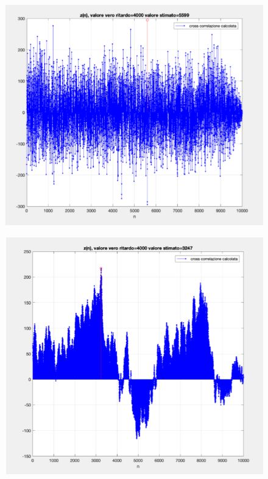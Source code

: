 \begin{minipage}{.45\textwidth}

	\begin{figure}[H]
		\centering
		\includegraphics[width=\textwidth]{./images/cap2/es3_grafico1.png}
	\end{figure}
	
\end{minipage}
\hfill
\begin{minipage}{.45\textwidth}
	
	\begin{figure}[H]
		\centering
		\includegraphics[width=\textwidth]{./images/cap2/es3_grafico2.png}
	\end{figure}

\end{minipage}

